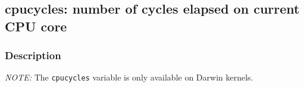 \clearpage
{}
{}
\label{vars:cpucycles}
\subsection*{cpucycles: number of cycles elapsed on current CPU core}

\subsubsection*{Description}

\emph{NOTE:} The \verb|cpucycles| variable is only available on Darwin
kernels.

